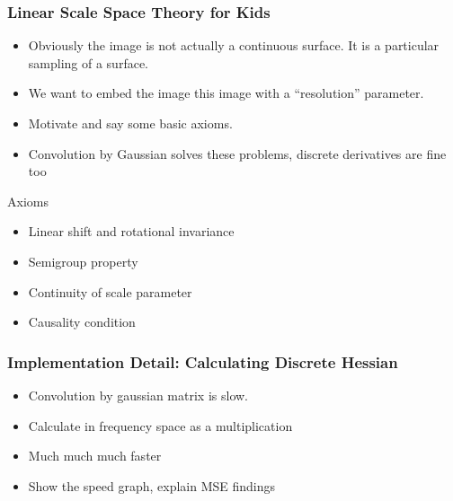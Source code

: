 \documentclass[9pt,notes]{beamer}
\begin{document}
\begin{frame}
\frametitle[Scale Space Theory]{Linear Scale Space Theory for Kids}
\begin{itemize}
  \item Obviously the image is not actually a continuous surface.
        It is a particular sampling of a surface. 
  \item We want to embed the image this image with a ``resolution'' parameter.
  \item Motivate and say some basic axioms.
  \item Convolution by Gaussian solves these problems, discrete derivatives are fine too
\end{itemize}

\begin{block}{Axioms}
  \begin{itemize}
    \item Linear shift and rotational invariance
    \item Semigroup property
    \item Continuity of scale parameter
    \item Causality condition
    \end{itemize}
  \end{block}
\end{frame}

\begin{frame}
\frametitle{Implementation Detail: Calculating Discrete Hessian}
\begin{itemize}
  \item Convolution by gaussian matrix is slow. 
  \item Calculate in frequency space as a multiplication
  \item Much much much faster
  \item Show the speed graph, explain MSE findings
\end{itemize}
\end{frame}
\end{document}
